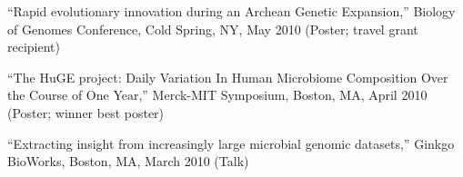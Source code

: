\documentclass[overlapped,line,11pt]{res}
\newenvironment{list2}{
  \begin{list}{$\bullet$}{%
      \setlength{\itemsep}{0in}
      \setlength{\parsep}{0in} \setlength{\parskip}{0in}
      \setlength{\topsep}{0in} \setlength{\partopsep}{0in} 
      \setlength{\leftmargin}{0.2in}}}{\end{list}}
\begin{document}
\begin{resume}
\begin{revnumerate}[19]
\item {``Rapid evolutionary innovation during an Archean Genetic
  Expansion,'' Biology of Genomes Conference, Cold Spring, NY,
  May 2010 (Poster; travel grant recipient)}
\vspace*{1mm}


\item {``The HuGE project: Daily Variation In Human Microbiome
Composition Over the Course of One Year,'' Merck-MIT Symposium,
Boston, MA, April 2010 (Poster; winner best poster)}
\vspace*{1mm}


\item {``Extracting insight from increasingly large microbial genomic
  datasets,'' Ginkgo BioWorks, Boston, MA, March 2010 (Talk)}
\vspace*{1mm}

\end{revnumerate}




\end{resume}
\end{document}
